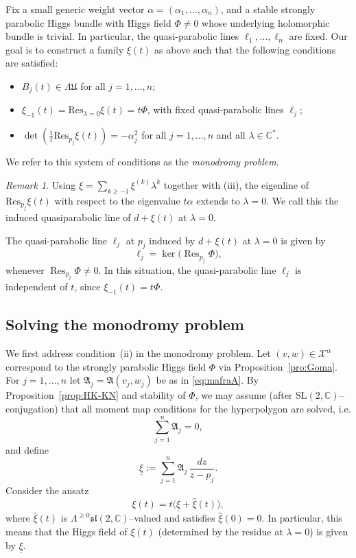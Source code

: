 \documentclass[12pt,a4paper]{amsart}
\theoremstyle{definition}
\theoremstyle{remark}
\newtheorem{remark}[theorem]{Remark}
\newcommand{\C}{\mathbb C}
\newcommand{\Res}{\mathrm{Res}}
\begin{document}
Fix a small generic weight vector $\alpha=(\alpha_1,\dots,\alpha_n)$, and a stable strongly parabolic Higgs bundle with 
Higgs field $\Phi\neq0$ whose underlying holomorphic bundle is trivial.
In particular, the quasi-parabolic lines $\ell_1,\dots,\ell_n$ are fixed.
Our goal is to construct a family $\xi(t)$ as above such that the following
conditions are satisfied:
\begin{itemize}
\item[(i)]
$B_j(t)\in\Lambda\mathfrak U$ for all $j=1,\dots,n$;
\item[(ii)]
$\xi_{-1}(t)= \Res_{\lambda=0}\xi(t)=t\Phi$,   with fixed quasi-parabolic lines $\ell_j$;
\item[(iii)]
$\det\!\left(\tfrac{1}{t}\Res_{p_j}\xi(t)\right)=-\alpha_j^2$
for all $j=1,\dots,n$ and all $\lambda\in\C^*$.
\end{itemize}
We refer to this system of conditions as the \emph{monodromy problem}.
\begin{remark}\label{rem:quasipara}
Using $\xi=\sum_{k\geq-1}\xi^{(k)}\lambda^k$
together with (iii), the eigenline of $\Res_{p_j}\xi(t)$ with respect to the eigenvalue $t\alpha$
extends to $\lambda=0.$ We call this the induced quasiparabolic line of $d+\xi(t)$ at $\lambda=0$.

The quasi-parabolic line $\ell_j$ at $p_j$ induced by $d+\xi(t)$ at $\lambda=0$ is given by
\[
\ell_j = \ker\bigl(\operatorname{Res}_{p_j}\Phi\bigr),
\]
whenever $\operatorname{Res}_{p_j}\Phi \neq 0$.
In this situation, the quasi-parabolic line $\ell_j$ is independent of $t$, since
$
\xi_{-1}(t) = t\Phi .
$
\end{remark}


\subsection{Solving the monodromy problem}

We first address condition~(ii) in the monodromy problem. Let $(v,w)\in\mathcal X^\alpha$ correspond to the strongly
parabolic Higgs field $\Phi$ via Proposition~\ref{pro:Goma}.
For $j=1,\dots,n$ let $\mathfrak A_j=\mathfrak A(v_j,w_j)$ be as in \eqref{eq:mafraA}.
By Proposition~\ref{prop:HK-KN} and stability of $\Phi$, we may assume (after
$\mathrm{SL}(2,\C)$--conjugation) that
all moment map conditions for the hyperpolygon are solved, i.e.
\[
\sum_{j=1}^n \mathfrak A_j = 0,
\]
and define
\begin{equation}\label{eq:xicentral}
\underline\xi
:=
\sum_{j=1}^n \mathfrak A_j\,\frac{dz}{z-p_j}.
\end{equation}
Consider the ansatz
\begin{equation}\label{eq:defxit}
\xi(t)
=
t\bigl(\underline\xi+\hat\xi(t)\bigr),
\end{equation}
where $\hat\xi(t)$ is $\Lambda^{\ge0}\mathfrak{sl}(2,\C)$--valued and satisfies
$\hat\xi(0)=0$.
 In particular, this means that the Higgs field of $\xi(t)$ 
(determined by the residue at $\lambda=0$) 
is  given by $\underline\xi$.
\end{document}
